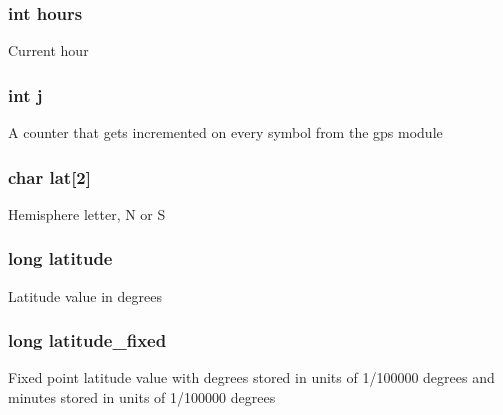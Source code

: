 \subsubsection[{hours}]{\setlength{\rightskip}{0pt plus 5cm}int hours}\label{struct_current_gps_reading_af23005df06fc3cd4264e5eee2dfa2f8c}
Current hour \hypertarget{struct_current_gps_reading_a37d972ae0b47b9099e30983131d31916}{}
\subsubsection[{j}]{\setlength{\rightskip}{0pt plus 5cm}int j}\label{struct_current_gps_reading_a37d972ae0b47b9099e30983131d31916}
A counter that gets incremented on every symbol from the gps module \hypertarget{struct_current_gps_reading_aa4087acf248a5b20278f44c9abe2fa62}{}
\subsubsection[{lat}]{\setlength{\rightskip}{0pt plus 5cm}char lat\mbox{[}2\mbox{]}}\label{struct_current_gps_reading_aa4087acf248a5b20278f44c9abe2fa62}
Hemisphere letter, N or S \hypertarget{struct_current_gps_reading_a04bf03d81f573f06783641463a84ae29}{}
\subsubsection[{latitude}]{\setlength{\rightskip}{0pt plus 5cm}long latitude}\label{struct_current_gps_reading_a04bf03d81f573f06783641463a84ae29}
Latitude value in degrees \hypertarget{struct_current_gps_reading_a636fa3631a9a6236e7dfbf2bb7e6030d}{}
\subsubsection[{latitude\+\_\+fixed}]{\setlength{\rightskip}{0pt plus 5cm}long latitude\+\_\+fixed}\label{struct_current_gps_reading_a636fa3631a9a6236e7dfbf2bb7e6030d}
Fixed point latitude value with degrees stored in units of 1/100000 degrees and minutes stored in units of 1/100000 degrees \hypertarget{struct_current_gps_reading_aa3c709569d317a96ed8adb103f97f92b}{}
